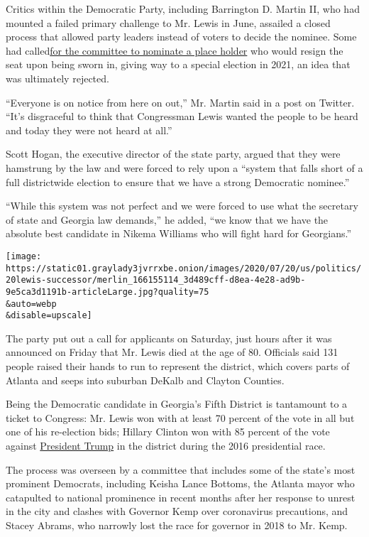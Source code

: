 Critics within the Democratic Party, including Barrington D. Martin II,
who had mounted a failed primary challenge to Mr. Lewis in June,
assailed a closed process that allowed party leaders instead of voters
to decide the nominee. Some had
called\href{https://www.ajc.com/politics/politics-blog/georgia-democrats-to-decide-today-who-will-replace-john-lewis-on-the-ballot/EZ33XDYU2FA43IGL2NBOE4EI3Q/}{for
the committee to nominate a place holder} who would resign the seat upon
being sworn in, giving way to a special election in 2021, an idea that
was ultimately rejected.

``Everyone is on notice from here on out,'' Mr. Martin said in a post on
Twitter. ``It's disgraceful to think that Congressman Lewis wanted the
people to be heard and today they were not heard at all.''

Scott Hogan, the executive director of the state party, argued that they
were hamstrung by the law and were forced to rely upon a ``system that
falls short of a full districtwide election to ensure that we have a
strong Democratic nominee.''

``While this system was not perfect and we were forced to use what the
secretary of state and Georgia law demands,'' he added, ``we know that
we have the absolute best candidate in Nikema Williams who will fight
hard for Georgians.''

\texttt{[image: https://static01.graylady3jvrrxbe.onion/images/2020/07/20/us/politics/20lewis-successor/merlin\_166155114\_3d489cff-d8ea-4e28-ad9b-9e5ca3d1191b-articleLarge.jpg?quality=75\\\&auto=webp\\\&disable=upscale]}

The party put out a call for applicants on Saturday, just hours after it
was announced on Friday that Mr. Lewis died at the age of 80. Officials
said 131 people raised their hands to run to represent the district,
which covers parts of Atlanta and seeps into suburban DeKalb and Clayton
Counties.

Being the Democratic candidate in Georgia's Fifth District is tantamount
to a ticket to Congress: Mr. Lewis won with at least 70 percent of the
vote in all but one of his re-election bids; Hillary Clinton won with 85
percent of the vote against
\href{https://www.nytimes3xbfgragh.onion/interactive/2020/us/elections/donald-trump.html}{President
Trump} in the district during the 2016 presidential race.

The process was overseen by a committee that includes some of the
state's most prominent Democrats, including Keisha Lance Bottoms, the
Atlanta mayor who catapulted to national prominence in recent months
after her response to unrest in the city and clashes with Governor Kemp
over coronavirus precautions, and Stacey Abrams, who narrowly lost the
race for governor in 2018 to Mr. Kemp.

